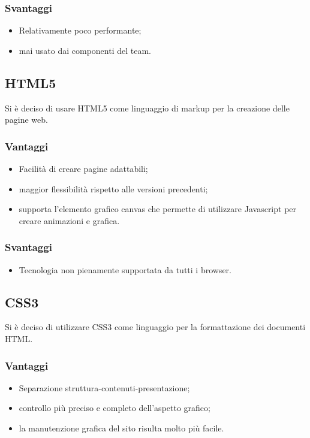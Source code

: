 \documentclass[a4paper, titlepage]{article}
\begin{document}
\subsubsection{Svantaggi}

\begin{itemize}
	\item Relativamente poco performante;
	\item mai usato dai componenti del team.
\end{itemize}

\subsection{HTML5}
Si è deciso di usare HTML5 come linguaggio di markup per la creazione delle pagine web.

\subsubsection{Vantaggi}

\begin{itemize}
	\item Facilità di creare pagine adattabili;
	\item maggior flessibilità rispetto alle versioni precedenti;
	\item supporta l'elemento grafico canvas che permette di utilizzare Javascript per creare animazioni e grafica.
\end{itemize}

\subsubsection{Svantaggi}

\begin{itemize}
	\item Tecnologia non pienamente supportata da tutti i browser.
\end{itemize}

\subsection{CSS3}
Si è deciso di utilizzare CSS3 come linguaggio per la formattazione dei documenti HTML.

\subsubsection{Vantaggi}

\begin{itemize}
	\item Separazione struttura-contenuti-presentazione;
	\item controllo più preciso e completo dell'aspetto grafico;
	\item la manutenzione grafica del sito risulta molto più facile.
\end{itemize}
\end{document}
